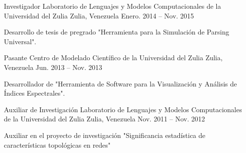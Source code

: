 \begin{cventries}

    \cventry
    {Investigador}
    {Laboratorio de Lenguajes y Modelos Computacionales de la Universidad del Zulia}
    {Zulia, Venezuela}
    {Enero. 2014 – Nov. 2015}
    {
        \begin{cvitems}
            \item {Desarrollo de tesis de pregrado "Herramienta para la Simulación de Parsing Universal".}
        \end{cvitems}
    }

    \cventry
    {Pasante}
    {Centro de Modelado Científico de la Universidad del Zulia}
    {Zulia, Venezuela}
    {Jun. 2013 – Nov. 2013}
    {
        \begin{cvitems}
            \item {Desarrollador de "Herramienta de Software para la Visualización y Análisis de Índices Espectrales".}
        \end{cvitems}
    }

    \cventry
    {Auxiliar de Investigación}
    {Laboratorio de Lenguajes y Modelos Computacionales de la Universidad del Zulia}
    {Zulia, Venezuela}
    {Nov. 2011 – Nov. 2012}
    {
        \begin{cvitems}
            \item {Auxiliar en el proyecto de investigación "Significancia estadística de características topológicas en redes"}
        \end{cvitems}
    }
\end{cventries}